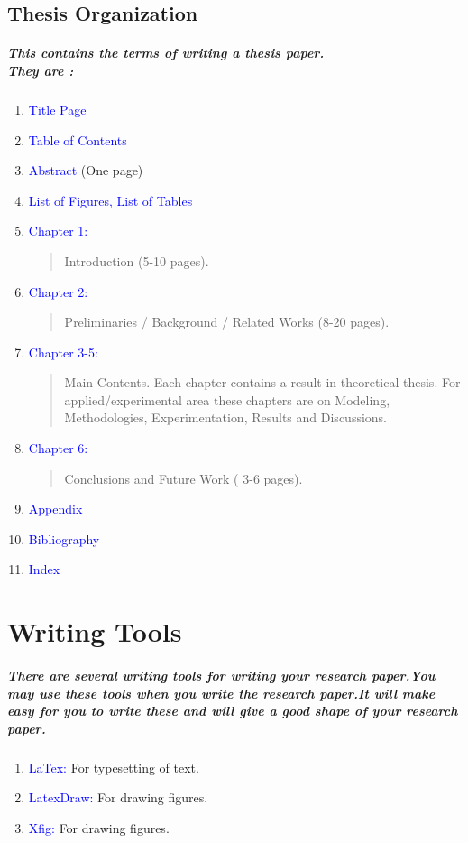 \documentclass[20pt]{report}
\begin{document}
  \section{Thesis Organization}
  \paragraph{This contains the terms of writing a thesis paper.\\They are :}
  \begin{enumerate}
  \item \textcolor {blue} {Title Page}
  \item \textcolor {blue} {Table of Contents}
  \item \textcolor {blue} {Abstract} (One page)
  \item \textcolor {blue} {List of Figures, List of Tables}
  \item \textcolor {blue} {Chapter 1:}\begin{verse}
  Introduction (5-10 pages).
  \end{verse}
   \item \textcolor {blue} {Chapter 2:}\begin{verse}
  Preliminaries / Background / Related Works (8-20
pages).
  \end{verse}
  \item \textcolor {blue} {Chapter 3-5:}\begin{verse}
  Main Contents. Each chapter contains a result in
theoretical thesis. For applied/experimental area
these chapters are on Modeling, Methodologies,
Experimentation, Results and Discussions.
  \end{verse}
  \item \textcolor {blue} {Chapter 6:}\begin{verse}
  Conclusions and Future Work ( 3-6 pages).
  \end{verse}
  \item \textcolor {blue} {Appendix}
  \item \textcolor {blue} {Bibliography}
  \item \textcolor {blue} {Index}
  \end{enumerate}
  

\chapter{Writing Tools}
\paragraph{There are several writing tools for writing your research paper.You may use these tools when you write the research paper.It will make easy for you to write these and will give a good shape of your research paper.}
\begin{enumerate}
\item \textcolor {blue} {LaTex: }For typesetting of text.
\item \textcolor {blue} {LatexDraw: }For drawing figures.
\item \textcolor {blue} {Xfig: }For drawing figures.
\end{enumerate}
\end{document}

